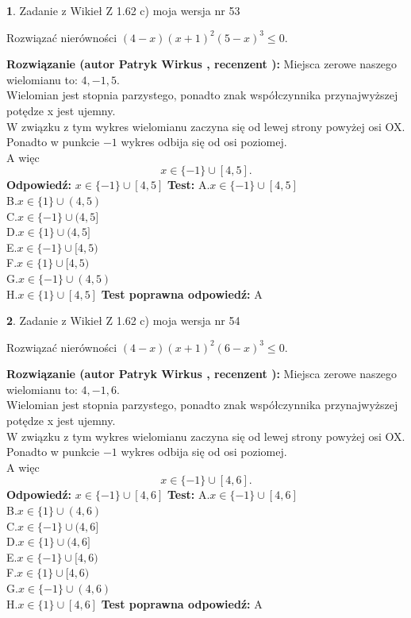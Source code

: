 \documentclass[12pt, a4paper]{article}
\theoremstyle{definition} %
\newtheorem{zad}{}
\newcommand{\zadStart}[1]{\begin{zad}#1\newline}
\newcommand{\zadStop}{\end{zad}}
\newcommand{\rozwStart}[2]{\noindent \textbf{Rozwiązanie (autor #1 , recenzent #2): }\newline}
\newcommand{\rozwStop}{\newline}
\newcommand{\odpStart}{\noindent \textbf{Odpowiedź:}\newline}
\newcommand{\odpStop}{\newline}
\newcommand{\testStart}{\noindent \textbf{Test:}\newline}
\newcommand{\testStop}{\newline}
\newcommand{\kluczStart}{\noindent \textbf{Test poprawna odpowiedź:}\newline}
\newcommand{\kluczStop}{\newline}
\begin{document}
\zadStart{Zadanie z Wikieł Z 1.62 c) moja wersja nr 53}

Rozwiązać nierówności $(4-x)(x+1)^{2}(5-x)^{3}\le0$.
\zadStop
\rozwStart{Patryk Wirkus}{}
Miejsca zerowe naszego wielomianu to: $4, -1, 5$.\\
Wielomian jest stopnia parzystego, ponadto znak współczynnika przy\linebreak najwyższej potędze x jest ujemny.\\ W związku z tym wykres wielomianu zaczyna się od lewej strony powyżej osi OX.\\
Ponadto w punkcie $-1$ wykres odbija się od osi poziomej.\\
A więc $$x \in \{-1\} \cup [4,5].$$
\rozwStop
\odpStart
$x \in \{-1\} \cup [4,5]$
\odpStop
\testStart
A.$x \in \{-1\} \cup [4,5]$\\
B.$x \in \{1\} \cup (4,5)$\\
C.$x \in \{-1\} \cup (4,5]$\\
D.$x \in \{1\} \cup (4,5]$\\
E.$x \in \{-1\} \cup [4,5)$\\
F.$x \in \{1\} \cup [4,5)$\\
G.$x \in \{-1\} \cup (4,5)$\\
H.$x \in \{1\} \cup [4,5]$
\testStop
\kluczStart
A
\kluczStop



\zadStart{Zadanie z Wikieł Z 1.62 c) moja wersja nr 54}

Rozwiązać nierówności $(4-x)(x+1)^{2}(6-x)^{3}\le0$.
\zadStop
\rozwStart{Patryk Wirkus}{}
Miejsca zerowe naszego wielomianu to: $4, -1, 6$.\\
Wielomian jest stopnia parzystego, ponadto znak współczynnika przy\linebreak najwyższej potędze x jest ujemny.\\ W związku z tym wykres wielomianu zaczyna się od lewej strony powyżej osi OX.\\
Ponadto w punkcie $-1$ wykres odbija się od osi poziomej.\\
A więc $$x \in \{-1\} \cup [4,6].$$
\rozwStop
\odpStart
$x \in \{-1\} \cup [4,6]$
\odpStop
\testStart
A.$x \in \{-1\} \cup [4,6]$\\
B.$x \in \{1\} \cup (4,6)$\\
C.$x \in \{-1\} \cup (4,6]$\\
D.$x \in \{1\} \cup (4,6]$\\
E.$x \in \{-1\} \cup [4,6)$\\
F.$x \in \{1\} \cup [4,6)$\\
G.$x \in \{-1\} \cup (4,6)$\\
H.$x \in \{1\} \cup [4,6]$
\testStop
\kluczStart
A
\kluczStop
\end{document}
